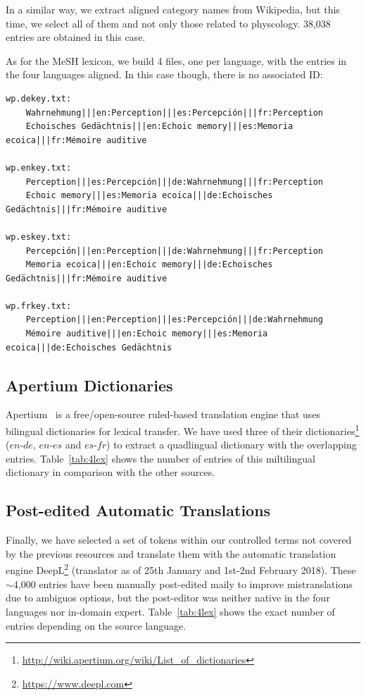 \documentclass[a4paper,11pt]{article}
\begin{document}
\bigskip
In a similar way, we extract aligned category names from Wikipedia, but this time, we select all of them and not only those related to physcology. 38,038 entries are obtained in this case.

As for the MeSH lexicon, we build 4 files, one per language, with the entries in the four languages aligned. In this case though, there is no associated ID:

{\small 
\begin{verbatim}
wp.dekey.txt:
    Wahrnehmung|||en:Perception|||es:Percepción|||fr:Perception
    Echoisches Gedächtnis|||en:Echoic memory|||es:Memoria ecoica|||fr:Mémoire auditive
    
wp.enkey.txt:
    Perception|||es:Percepción|||de:Wahrnehmung|||fr:Perception
    Echoic memory|||es:Memoria ecoica|||de:Echoisches Gedächtnis|||fr:Mémoire auditive
    
wp.eskey.txt:
    Percepción|||en:Perception|||de:Wahrnehmung|||fr:Perception
    Memoria ecoica|||en:Echoic memory|||de:Echoisches Gedächtnis|||fr:Mémoire auditive
    
wp.frkey.txt:
    Perception|||en:Perception|||es:Percepción|||de:Wahrnehmung
    Mémoire auditive|||en:Echoic memory|||es:Memoria ecoica|||de:Echoisches Gedächtnis
\end{verbatim}
}


\subsection{Apertium Dictionaries}
\label{ss:apertium}

Apertium~\cite{forcadaEtal:2011} is a free/open-source ruled-based translation engine that uses bilingual dictionaries for lexical transfer. We have used three of their dictionaries\footnote{\url{http://wiki.apertium.org/wiki/List_of_dictionaries}} ($en$-$de$, $en$-$es$ and $es$-$fr$) to extract a quadlingual dictionary with the overlapping entries. Table~\ref{tab:4lex} shows the number of entries of this miltilingual dictionary in comparison with the other sources.

\subsection{Post-edited Automatic Translations}
\label{ss:manual}

Finally, we have selected a set of tokens within our controlled terms not covered by the previous resources and translate them with the automatic translation engine DeepL\footnote{\url{https://www.deepl.com}}  (translator as of 25th January and 1st-2nd February 2018). These $\sim$4,000 entries have been manually post-edited  maily to improve mistranslations due to ambiguos options, but the post-editor was neither native in the four languages nor in-domain expert. Table~\ref{tab:4lex} shows the exact number of entries depending on the source language.
\end{document}
